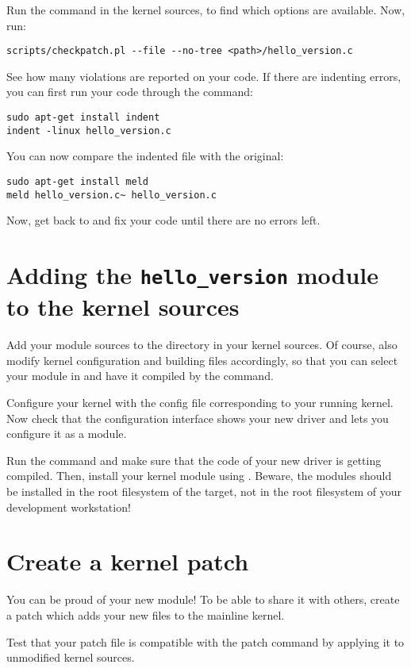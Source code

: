 Run the  command in the kernel sources,
to find which options are available.  Now, run:

\begin{verbatim}
scripts/checkpatch.pl --file --no-tree <path>/hello_version.c
\end{verbatim}

See how many violations are reported on your code. If there are
indenting errors, you can first run your code through the 
command:

\begin{verbatim}
sudo apt-get install indent
indent -linux hello_version.c
\end{verbatim}

You can now compare the indented file with the original:

\begin{verbatim}
sudo apt-get install meld
meld hello_version.c~ hello_version.c
\end{verbatim}

Now, get back to  and fix your code until there are
no errors left.

\section{Adding the {\tt hello\_version} module to the kernel sources}

Add your module sources to the  directory in your
kernel sources. Of course, also modify kernel configuration and
building files accordingly, so that you can select your module in
 and have it compiled by the  command.

Configure your kernel with the config file corresponding to your
running kernel. Now check that the configuration interface shows your
new driver and lets you configure it as a module.

Run the  command and make sure that the code of your new
driver is getting compiled. Then, install your kernel module using
. Beware, the modules should be installed
in the root filesystem of the target, not in the root filesystem of
your development workstation!

\section{Create a kernel patch}

You can be proud of your new module! To be able to share it with
others, create a patch which adds your new files to the mainline
kernel.

Test that your patch file is compatible with the patch command by
applying it to unmodified kernel sources.
